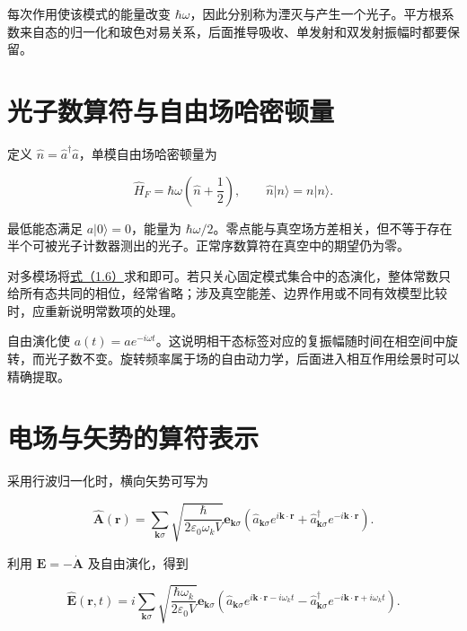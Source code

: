 \documentclass[UTF8,a4paper,zihao=-4,openany,fontset=fandol]{ctexbook}
\begin{document}
每次作用使该模式的能量改变 $\hbar\omega$，因此分别称为湮灭与产生一个光子。平方根系数来自态的归一化和玻色对易关系，后面推导吸收、单发射和双发射振幅时都要保留。



\section{光子数算符与自由场哈密顿量}\label{sec:01:4}


定义 $\hat n=\hat a^\dagger\hat a$，单模自由场哈密顿量为



\begin{equation*}
\hat H_F=\hbar\omega\left(\hat n+\frac12\right),\qquad
\hat n|n\rangle=n|n\rangle.
\tag{1.6}\label{eq:1.6}
\end{equation*}


最低能态满足 $a|0\rangle=0$，能量为 $\hbar\omega/2$。零点能与真空场方差相关，但不等于存在半个可被光子计数器测出的光子。正常序数算符在真空中的期望仍为零。



对多模场将\hyperref[eq:1.6]{式（1.6）}求和即可。若只关心固定模式集合中的态演化，整体常数只给所有态共同的相位，经常省略；涉及真空能差、边界作用或不同有效模型比较时，应重新说明常数项的处理。



自由演化使 $a(t)=ae^{-i\omega t}$。这说明相干态标签对应的复振幅随时间在相空间中旋转，而光子数不变。旋转频率属于场的自由动力学，后面进入相互作用绘景时可以精确提取。



\section{电场与矢势的算符表示}\label{sec:01:5}


采用行波归一化时，横向矢势可写为



\begin{equation*}
\hat{\mathbf A}(\mathbf r)=\sum_{\mathbf k\sigma}
\sqrt{\frac{\hbar}{2\varepsilon_0\omega_kV}}
\mathbf e_{\mathbf k\sigma}
\left(\hat a_{\mathbf k\sigma}e^{i\mathbf k\cdot\mathbf r}
+\hat a_{\mathbf k\sigma}^\dagger e^{-i\mathbf k\cdot\mathbf r}\right).
\tag{1.7}\label{eq:1.7}
\end{equation*}


利用 $\mathbf E=-\dot{\mathbf A}$ 及自由演化，得到



\begin{equation*}
\hat{\mathbf E}(\mathbf r,t)=i\sum_{\mathbf k\sigma}
\sqrt{\frac{\hbar\omega_k}{2\varepsilon_0V}}
\mathbf e_{\mathbf k\sigma}
\left(\hat a_{\mathbf k\sigma}e^{i\mathbf k\cdot\mathbf r-i\omega_kt}
-\hat a_{\mathbf k\sigma}^\dagger e^{-i\mathbf k\cdot\mathbf r+i\omega_kt}\right).
\tag{1.8}\label{eq:1.8}
\end{equation*}
\end{document}
